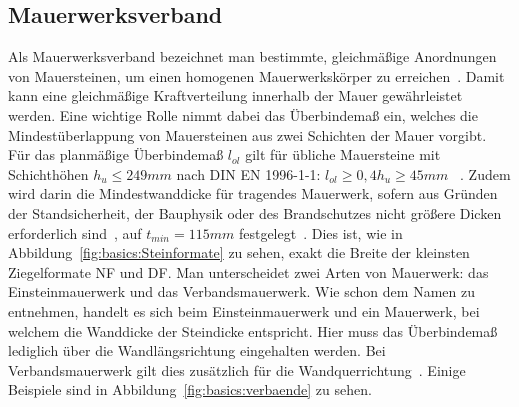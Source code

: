 \subsection{Mauerwerksverband}\label{basics:Mauerwerksverband}
Als Mauerwerksverband bezeichnet man bestimmte, gleichmäßige Anordnungen von Mauersteinen, um einen homogenen Mauerwerkskörper zu erreichen~\cite{Mauerwer39:online}.
Damit kann eine gleichmäßige Kraftverteilung innerhalb der Mauer gewährleistet werden.
Eine wichtige Rolle nimmt dabei das Überbindemaß ein, welches die Mindestüberlappung von Mauersteinen aus zwei Schichten der Mauer vorgibt.
Für das planmäßige Überbindemaß \(l_{ol}\) gilt für übliche Mauersteine mit Schichthöhen 
\(h_{u} \leq 249 mm\) 
nach DIN EN 1996-1-1: 
\(l_{ol} \geq 0,4h_{u} \geq 45 mm\)
~\cite{Bemessun72:online}\cite{DIN_EN_1996_1_1}.
Zudem wird darin die Mindestwanddicke für tragendes Mauerwerk, \glqq{}sofern aus Gründen der Standsicherheit, der Bauphysik oder des Brandschutzes nicht größere Dicken erforderlich sind\grqq{}~\cite{Bemessun72:online}, auf 
\(t_{min} = 115 mm\) 
festgelegt~\cite{DIN_EN_1996_1_1}.
Dies ist, wie in Abbildung~\ref{fig:basics:Steinformate} zu sehen, exakt die Breite der kleinsten Ziegelformate NF und DF.
Man unterscheidet zwei Arten von Mauerwerk: das Einsteinmauerwerk und das Verbandsmauerwerk.
Wie schon dem Namen zu entnehmen, handelt es sich beim Einsteinmauerwerk und ein Mauerwerk, bei welchem die Wanddicke der Steindicke entspricht.
Hier muss das Überbindemaß lediglich über die Wandlängsrichtung eingehalten werden.
Bei Verbandsmauerwerk gilt dies zusätzlich für die Wandquerrichtung~\cite{05maurer1:online}.
Einige Beispiele sind in Abbildung~\ref{fig:basics:verbaende} zu sehen.

